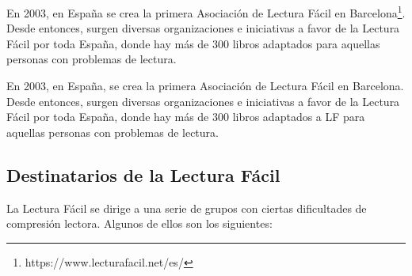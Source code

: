  \setlength{\parskip}{10pt}
 
En 2003, en España se crea la primera Asociación de Lectura Fácil en Barcelona\footnote{https://www.lecturafacil.net/es/}. Desde entonces, surgen diversas organizaciones e iniciativas a favor de la Lectura Fácil por toda España, donde hay más de 300 libros adaptados para aquellas personas con problemas de lectura.

En 2003, en España, se crea la primera Asociación de Lectura Fácil en Barcelona. Desde entonces, surgen diversas organizaciones e iniciativas a favor de la Lectura Fácil por toda España, donde hay más de 300 libros adaptados a LF para aquellas personas con problemas de lectura.


\subsection{Destinatarios de la Lectura Fácil}
La Lectura Fácil se dirige a una serie de grupos con ciertas dificultades de compresión lectora. Algunos de ellos son los siguientes: 
 
